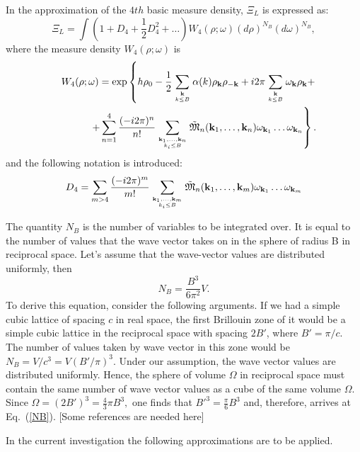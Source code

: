 In the approximation of the $4th$ basic measure density, $\Xi_L$ is expressed as:
\begin{equation}
\label{gpf_l3}
\Xi_L = \int (1 + D_4 + \frac12D_4^2 + \dotsc) W_4 (\rho;\omega) (d\rho)^{N_B}(d\omega)^{N_B}, 
\end{equation}
where the measure density $W_4(\rho; \omega)$ is
\begin{eqnarray}
	\label{meas_dens_1}
	&& W_4(\rho;\omega) = \exp \left\{ h\rho_0
	- \frac12  \sum\limits_{{\vb k}\atop k\le B} \alpha(k) \rho_{\vb k} \rho_{-{\vb k}}
	+ i2\pi \sum\limits_{{\vb k} \atop k\le B} \omega_{\vb k} \rho_{\vb k} + \right.  \nonumber\\
	&& \left.+
	\sum\limits_{n=1}^4 \frac{(-i2\pi)^n}{n!} 
	\sum\limits_{\vb{k}_1,\dotsc,\vb{k}_n\atop{k_i \le B}} \tilde{\frak M}_n(\vb{k}_1,\dotsc,\vb{k}_n)
	\omega_{{\vb k}_1} \dots \omega_{{\vb k}_n} \right\}.
\end{eqnarray}
and the following notation is introduced:
\begin{equation}
D_4 = \sum_{m>4}\frac{(-i2\pi)^m}{m!} \sum\limits_{\vb{k}_1,\dotsc,\vb{k}_m\atop{k_i \le B}}
\tilde{\frak M}_n(\vb{k}_1,\dotsc,\vb{k}_m)
\omega_{{\vb k}_1} \dots \omega_{{\vb k}_m}
\end{equation}

The quantity $N_B$ is the number of variables to be integrated over. It is equal to the
number of values that the wave vector takes on in the sphere of radius B in reciprocal space. Let's assume that the wave-vector values are distributed uniformly, then
\begin{equation}
\label{NB}
N_B = \frac{B^3}{6\pi^2}V.
\end{equation}
To derive this equation, consider the following arguments. If we had a simple cubic lattice of spacing
$c$ in real space, the first Brillouin zone of it would be a simple cubic lattice in the reciprocal
space with spacing $2B'$, where $B'=\pi/c$. The number of values taken by wave vector in this zone
would be $N_{B} = V/c^3 = V(B'/\pi)^3.$ Under our assumption, the wave vector values are distributed
uniformly. Hence, the sphere of volume $\Omega$ in reciprocal space must contain the same number of wave
vector values as a cube of the same volume $\Omega$. Since $\Omega = (2B')^3 = \frac43\pi B^3,$ one finds that $B'^3=\frac{\pi}{6}B^3$ and, therefore, arrives at Eq.~(\ref{NB}). [Some references are needed here]

In the current investigation the following approximations are to be applied.

